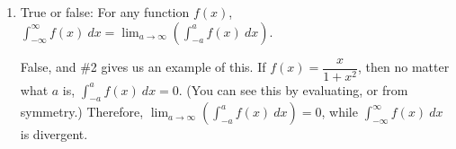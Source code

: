 \documentclass[main]{subfiles}
\begin{document}
\begin{enumerate}
  \begin{solution}
  We need to split this up as a sum of two improper integrals.  We may
  as well split it at 0 to write it as
  \[ \int_{-\infty}^\infty \frac{x}{1 + x^2}~dx = \int_{-\infty}^0
  \frac{x}{1 + x^2}~dx + \int_{0}^\infty \frac{x}{1 + x^2}~dx.\]
  We need to look at each piece individually.  Let's first just evaluate
  the indefinite integral $\displaystyle \int \frac{x}{1 + x^2}~dx$ by
  substituting $u = 1 + x^2$ (so $du = 2x~dx$):
  \begin{align*}
  \int \frac{x}{1 + x^2}~dx &= \int \frac{1}{2} \cdot \frac{1}{u}~du
  \\
  &= \frac{1}{2} \ln |u| + C \\
  &= \frac{1}{2} \ln |1 + x^2| + C \\
  &= \frac{1}{2} \ln (1 + x^2) + C \textrm{ since $1 + x^2$ is always
  positive}
  \end{align*}
  Therefore,
  \begin{align*}
  \int_0^\infty \frac{x}{1 + x^2}~dx &= \lim_{b \to \infty} \int_0^b
  \frac{x}{1 + x^2}~dx \\
  &= \lim_{b \to \infty} \left( \ln (1 + x^2) \Big|_0^b \right) \\
  &= \lim_{b \to \infty} [\ln(1 + b^2) - \ln 1] \\
  &= \lim_{b \to \infty} \ln (1 + b^2) \\
  &= \infty \textrm{ (diverges)}
  \end{align*}
  Since this piece diverges, we know that $\displaystyle
  \int_{-\infty}^\infty \frac{x}{1 + x^2}~dx$ .  (We
  don't even need to evaluate $\displaystyle \int_{-\infty}^0 \frac{x}{1
  + x^2}~dx$ since we've already concluded that this one piece
  diverges.) 
  \end{solution}

  \item 
  \begin{problem}[\vfill]
  True or false: For any function $f(x)$, $\displaystyle
  \int_{-\infty}^\infty f(x)~dx = \lim_{a \to \infty} \left( \int_{-a}^a
  f(x)~dx \right)$.
  \end{problem}

  \begin{solution}
  False, and {\#2} gives us an example of this.  If
  $f(x) = \dfrac{x}{1 + x^2}$, then no matter what $a$ is,
  $\displaystyle \int_{-a}^a f(x)~dx = 0$.  (You can see this by
  evaluating, or from symmetry.)  Therefore, $\displaystyle \lim_{a \to
  \infty} \left( \int_{-a}^a f(x)~dx \right) = 0$, while
  $\displaystyle \int_{-\infty}^\infty f(x)~dx$ is divergent.
  \end{solution}




            
\end{enumerate}
\end{document}
